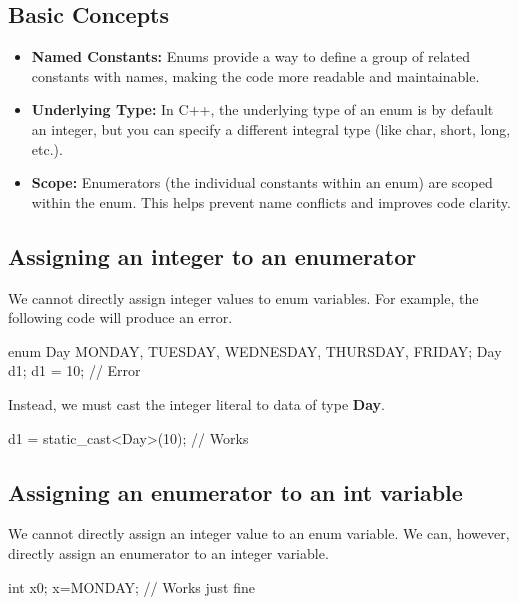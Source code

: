 \documentclass{report}
\begin{document}
    \bigbreak \noindent 
    \subsection{Basic Concepts}
    \begin{itemize}
        \item \textbf{Named Constants:} Enums provide a way to define a group of related constants with names, making the code more readable and maintainable.
        \item \textbf{Underlying Type:} In C++, the underlying type of an enum is by default an integer, but you can specify a different integral type (like char, short, long, etc.).
        \item \textbf{Scope:} Enumerators (the individual constants within an enum) are scoped within the enum. This helps prevent name conflicts and improves code clarity.
    \end{itemize}

    \bigbreak \noindent 
    \subsection{Assigning an integer to an enumerator}
    \bigbreak \noindent 
    We cannot directly assign integer values to enum variables. For example, the following code will produce an error.
    \bigbreak \noindent 
    
    \begin{cppcode}
enum Day { MONDAY, TUESDAY, WEDNESDAY, THURSDAY, FRIDAY};
Day d1;
d1 = 10; // Error
    \end{cppcode}
    
    \bigbreak \noindent 
    Instead, we must cast the integer literal to data of type \textbf{Day}. 
    \bigbreak \noindent 
    
    \begin{cppcode}
d1 = static_cast<Day>(10); // Works
    \end{cppcode}
    

    \bigbreak \noindent 
    \subsection{Assigning an enumerator to an int variable}
    \bigbreak \noindent 
    We cannot directly assign an integer value to an enum variable. We can, however, directly assign an enumerator to an integer variable.
    \bigbreak \noindent 
    
    \begin{cppcode}
int x{0};
x=MONDAY; // Works just fine
    \end{cppcode}
    
\end{document}
